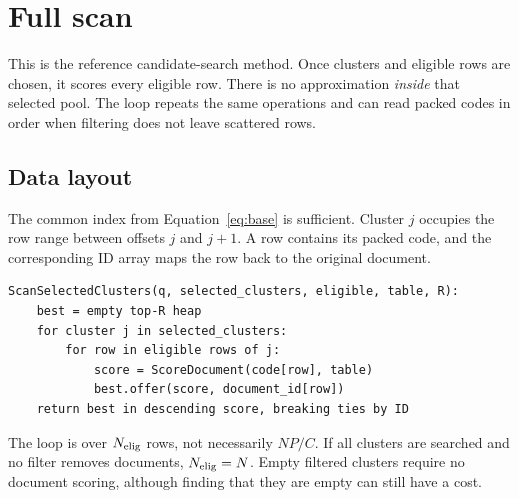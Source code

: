 \section{Full scan}
\label{sec:scan}
This is the reference candidate-search method. Once clusters and eligible rows are chosen,
it scores every eligible row. There is no approximation \emph{inside} that selected pool.
The loop repeats the same operations and can read packed codes in order when filtering does
not leave scattered rows.


\subsection{Data layout}
The common index from Equation~\eqref{eq:base} is sufficient. Cluster $j$ occupies the row
range between offsets $j$ and $j+1$. A row contains its packed code, and the corresponding ID
array maps the row back to the original document.

\par\noindent\begin{minipage}{\linewidth}
\begin{lstlisting}[caption={Candidate search for Approach A.}]
ScanSelectedClusters(q, selected_clusters, eligible, table, R):
    best = empty top-R heap
    for cluster j in selected_clusters:
        for row in eligible rows of j:
            score = ScoreDocument(code[row], table)
            best.offer(score, document_id[row])
    return best in descending score, breaking ties by ID
\end{lstlisting}
\end{minipage}\par

The loop is over $N_{\mathrm{elig}}$ rows, not necessarily $NP/C$. If all clusters are searched and no
filter removes documents, $N_{\mathrm{elig}}=N$. Empty filtered clusters require no document scoring,
although finding that they are empty can still have a cost.

